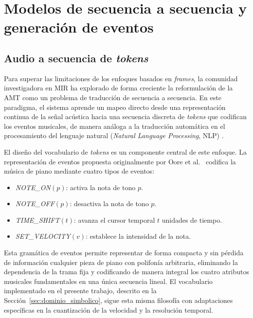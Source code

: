 \section{Modelos de secuencia a secuencia y generación de eventos}
\label{sec:seq2seq}

\subsection{Audio a secuencia de \textit{tokens}}

Para superar las limitaciones de los enfoques basados en \textit{frames},
la comunidad investigadora en MIR ha explorado de forma creciente la
reformulación de la AMT como un problema de traducción de secuencia a
secuencia. En este paradigma,
el sistema aprende un mapeo directo desde una representación continua de
la señal acústica hacia una secuencia discreta de \textit{tokens} que
codifican los eventos musicales, de manera análoga a la traducción
automática en el procesamiento del lenguaje natural
(\textit{Natural Language Processing}, NLP) \cite{oore2020time}.

El diseño del vocabulario de \textit{tokens} es un componente central
de este enfoque. La representación de eventos propuesta originalmente
por Oore et al.\ \cite{oore2020time} codifica la música de piano
mediante cuatro tipos de eventos:

\begin{itemize}
    \item \textit{NOTE\_ON}$(p)$: activa la nota de tono $p$.
    \item \textit{NOTE\_OFF}$(p)$: desactiva la nota de tono $p$.
    \item \textit{TIME\_SHIFT}$(t)$: avanza el cursor temporal $t$
          unidades de tiempo.
    \item \textit{SET\_VELOCITY}$(v)$: establece la intensidad de la nota.
\end{itemize}

Esta gramática de eventos permite representar de forma compacta y sin
pérdida de información cualquier pieza de piano con polifonía arbitraria,
eliminando la dependencia de la trama fija y codificando de manera
integral los cuatro atributos musicales fundamentales en una única
secuencia lineal. El vocabulario implementado en el presente trabajo,
descrito en la Sección~\ref{sec:dominio_simbolico}, sigue esta misma
filosofía con adaptaciones específicas en la cuantización de la velocidad
y la resolución temporal.

